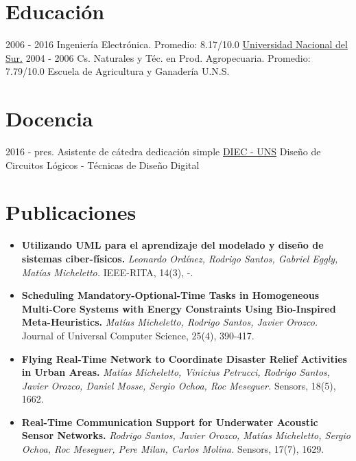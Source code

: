 \documentclass[letterpaper]{twentysecondcv} %
\begin{document}
\makeprofilefirst %

\section{Educación}
\begin{twenty}
    \twentyitem
        {2006 - 2016}
        {}
        {Ingeniería Electrónica.}
        {Promedio: 8.17/10.0}
        {\href{http://www.uns.edu.ar/}{Universidad Nacional del Sur.}}
        {}
    \twentyitem
        {2004 - 2006}
        {}
        {Cs. Naturales y Téc. en Prod. Agropecuaria.}
        {Promedio: 7.79/10.0}
        {Escuela de Agricultura y Ganadería U.N.S.}
        {}
\end{twenty}

\section{Docencia}
\begin{twenty}
    \twentyitem
        {2016 - pres.}
        {}
        {Asistente de cátedra dedicación simple}
        {\href{http://www.diec.uns.edu.ar/}{DIEC - UNS}}
        {}
        {Diseño de Circuitos Lógicos - Técnicas de Diseño Digital}
\end{twenty}

\section{Publicaciones}
{\begin{itemize}
\item {\bf Utilizando UML para el aprendizaje del modelado y diseño de sistemas ciber-físicos.} \textit{Leonardo Ordínez, Rodrigo Santos, Gabriel Eggly, Matías Micheletto.}
IEEE-RITA, 14(3), -.
\item {\bf Scheduling Mandatory-Optional-Time Tasks in Homogeneous Multi-Core Systems with Energy Constraints Using Bio-Inspired Meta-Heuristics.} \textit{Matías Micheletto, Rodrigo Santos, Javier Orozco.} Journal of Universal Computer Science, 25(4), 390-417.
\item {\bf Flying Real-Time Network to Coordinate Disaster Relief Activities in Urban Areas.} \textit{Matías Micheletto, Vinicius Petrucci, Rodrigo Santos, Javier Orozco, Daniel Mosse, Sergio Ochoa, Roc Meseguer.} Sensors, 18(5), 1662.
\item {\bf Real-Time Communication Support for Underwater Acoustic Sensor Networks.} \textit{Rodrigo Santos, Javier Orozco, Matías Micheletto, Sergio Ochoa, Roc Meseguer, Pere Milan, Carlos Molina.} Sensors, 17(7), 1629.
\end{itemize}}
\end{document}
